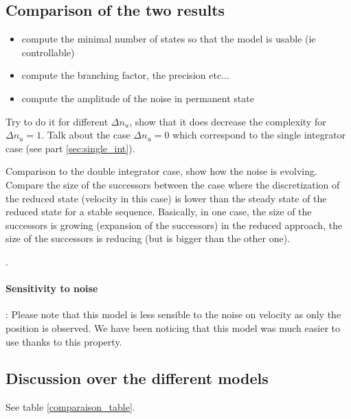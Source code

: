 \subsection{Comparison of the two results}
\begin{itemize}
\item compute the minimal number of states so that the model is usable (ie controllable)
\item compute the branching factor, the precision etc...
\item compute the amplitude of the noise in permanent state
\end{itemize}

Try to do it for different $\Delta n_u$, show that it does decrease the complexity for $\Delta n_u = 1$. Talk about the case $\Delta n_u = 0$ which correspond to the single integrator case (see part \ref{sec:single_int}).

Comparison to the double integrator case, show how the noise is evolving. Compare the size of the successors between the case where the discretization of the reduced state (velocity in this case) is lower than the steady state of the reduced state for a stable sequence. Basically, in one case, the size of the successors is growing (expansion of the successors) in the reduced approach, the size of the successors is reducing (but is bigger than the other one).


.

\paragraph{Sensitivity to noise}:
Please note that this model is less sensible to the noise on velocity as only the position is observed.
We have been noticing that this model was much easier to use thanks to this property.

\subsection{Discussion over the different models}
See table \ref{comparaison_table}.


